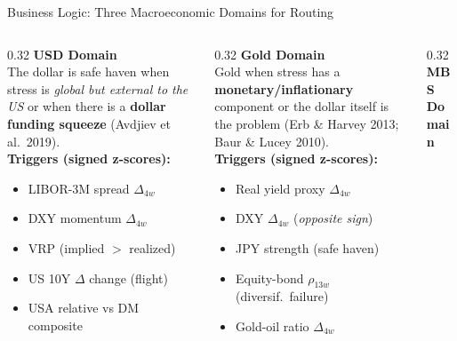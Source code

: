 \documentclass[aspectratio=169, 11pt]{beamer}
\begin{document}
\begin{frame}{Business Logic: Three Macroeconomic Domains for Routing}
\small
\begin{columns}[T]
\begin{column}{0.32\textwidth}
  \textbf{\color{polimiblue}USD Domain}\\[0.15cm]
  \footnotesize
  The dollar is safe haven when stress is \textit{global but external to the US} or when there is a \textbf{dollar funding squeeze} (Avdjiev et al.\ 2019).\\[0.2cm]
  \textbf{Triggers (signed z-scores):}
  \begin{itemize}\setlength\itemsep{0.05cm}
    \item[\color{polimiblue}$+$] LIBOR-3M spread $\Delta_{4w}$
    \item[\color{polimiblue}$+$] DXY momentum $\Delta_{4w}$
    \item[\color{polimiblue}$+$] VRP (implied $>$ realized)
    \item[\color{polimiblue}$-$] US 10Y $\Delta$ change (flight)
    \item[\color{polimiblue}$+$] USA relative vs DM composite
  \end{itemize}
\end{column}
\begin{column}{0.32\textwidth}
  \textbf{\color{polimigold}Gold Domain}\\[0.15cm]
  \footnotesize
  Gold when stress has a \textbf{monetary/inflationary} component or the dollar itself is the problem (Erb \& Harvey 2013; Baur \& Lucey 2010).\\[0.2cm]
  \textbf{Triggers (signed z-scores):}
  \begin{itemize}\setlength\itemsep{0.05cm}
    \item[\color{polimigold}$-$] Real yield proxy $\Delta_{4w}$
    \item[\color{polimigold}$-$] DXY $\Delta_{4w}$ (\textit{opposite sign})
    \item[\color{polimigold}$+$] JPY strength (safe haven)
    \item[\color{polimigold}$+$] Equity-bond $\rho_{13w}$ (diversif.\ failure)
    \item[\color{polimigold}$+$] Gold-oil ratio $\Delta_{4w}$
  \end{itemize}
\end{column}
\begin{column}{0.32\textwidth}
  \textbf{\color{gray}MBS Domain}\\[0.15cm]

\end{column}
\end{columns}
\end{frame}
\end{document}
